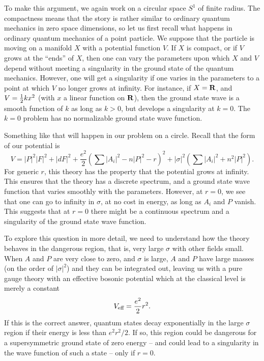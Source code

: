 To make this argument, we again work on a circular space $S^1$ of finite
radius.  The compactness means that the story is rather similar to
ordinary quantum mechanics in zero space dimensions, so
let us first recall what happens in ordinary quantum mechanics of a point
particle.  We suppose that the particle is moving on a manifold $X$
with a potential function $V$.  If $X$ is compact, or if $V$ grows
at the ``ends'' of $X$, then one can vary the parameters upon which
$X$ and $V$ depend without meeting a singularity in the ground state
of the quantum mechanics.  However, one will get a singularity if
one varies in the parameters to a point at which $V$ no longer
grows at infinity.  For instance, if $X={\bf R}$, and $V={1\over 2}k
x^2$ (with $x$ a linear function on ${\bf R}$), then the ground state
wave is a smooth function of $k$ as long as $k>0$, but develops a singularity
at $k=0$.  The $k=0$ problem has no normalizable ground state wave
function.

Something like that will happen in our problem on a circle.
Recall that the form of our potential is
$$V=|P|^2|F|^2+|dF|^2+\frac{e^2}2\left(\sum|A_i|^2-n|P|^2-r\right)^2
+|\sigma|^2\left(\sum|A_i|^2+n^2|P|^2\right).$$
For generic $r$, this theory has the property that the potential
grows at infinity.  This ensures that the theory has a discrete
spectrum, and a ground state wave function that varies smoothly
with the parameters.  However, at $r=0$, we see that one can go to infinity
in $\sigma$, at no cost in energy, as long as $A_i$ and $P$ vanish.
This suggests that at $r=0$ there might be a continuous spectrum
and a singularity of the ground state wave function.



To explore this question in more detail, we need to understand  how
the theory behaves in the dangerous region, that is, very large $\sigma$
with other fields small.
When $A$ and $P$ are very close to zero, and $\sigma$ is large, $A$ and $P$
have large masses (on the order of $|\sigma|^2$) and they can be
integrated out, leaving us with a pure gauge theory with
an effective bosonic potential which at the classical level is merely
a constant
\begin{equation}\label{effbospot}
V_{\mbox{\scriptsize eff}}=\frac{e^2}2r^2.
\end{equation}
If this is the correct answer, quantum states decay exponentially
in the large  $\sigma$ region if their energy is less than $e^2r^2/2$.
If so, this region could be  dangerous for a supersymmetric ground
state of zero energy -- and could lead to a singularity in the wave function
of such a state -- only if $r=0$.

